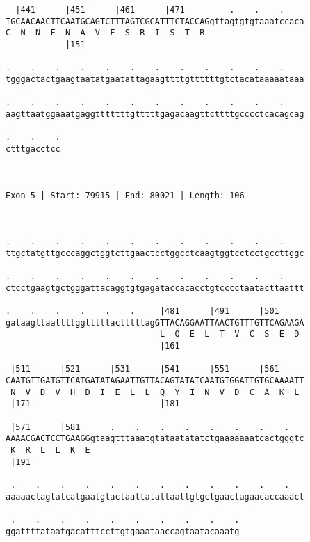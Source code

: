 \documentclass{article}
\begin{document}
\begin{Verbatim}
  |441      |451      |461      |471         .    .    .    
TGCAACAACTTCAATGCAGTCTTTAGTCGCATTTCTACCAGgttagtgtgtaaatccaca
C  N  N  F  N  A  V  F  S  R  I  S  T  R                    
            |151                                            
  
.    .    .    .    .    .    .    .    .    .    .    .    
tgggactactgaagtaatatgaatattagaagttttgttttttgtctacataaaaataaa
                                                            
.    .    .    .    .    .    .    .    .    .    .    .    
aagttaatggaaatgaggtttttttgtttttgagacaagttcttttgcccctcacagcag
                                                            
.    .    .
ctttgacctcc
           
           
 
Exon 5 | Start: 79915 | End: 80021 | Length: 106



.    .    .    .    .    .    .    .    .    .    .    .    
ttgctatgttgcccaggctggtcttgaactcctggcctcaagtggtcctcctgccttggc
                                                            
.    .    .    .    .    .    .    .    .    .    .    .    
ctcctgaagtgctgggattacaggtgtgagataccacacctgtcccctaatacttaattt
                                                            
.    .    .    .    .    .     |481      |491      |501     
gataagttaattttggtttttactttttagGTTACAGGAATTAACTGTTTGTTCAGAAGA
                               L  Q  E  L  T  V  C  S  E  D 
                               |161                         
  
 |511      |521      |531      |541      |551      |561     
CAATGTTGATGTTCATGATATAGAATTGTTACAGTATATCAATGTGGATTGTGCAAAATT
 N  V  D  V  H  D  I  E  L  L  Q  Y  I  N  V  D  C  A  K  L 
 |171                          |181                         
  
 |571      |581      .    .    .    .    .    .    .    .   
AAAACGACTCCTGAAGGgtaagtttaaatgtataatatatctgaaaaaaatcactgggtc
 K  R  L  L  K  E                                           
 |191                                                       
  
 .    .    .    .    .    .    .    .    .    .    .    .   
aaaaactagtatcatgaatgtactaattatattaattgtgctgaactagaacaccaaact
                                                            
 .    .    .    .    .    .    .    .    .    .
ggattttataatgacatttccttgtgaaataaccagtaatacaaatg
                                               

\end{Verbatim}
\end{document}

